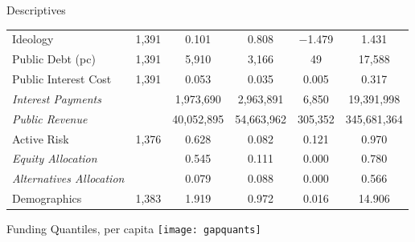 \documentclass{beamer}
\begin{document}
\begin{frame}{\textmd{Descriptives}}
\begin{table}
\begin{tiny}
\begin{center}
\begin{tabular}{@{\extracolsep{5pt}}lccccc}
Ideology & 1,391 & 0.101 & 0.808 & $-$1.479 & 1.431 \\ 
Public Debt (pc) & 1,391 & 5,910 & 3,166 & 49 & 17,588 \\ 
Public Interest Cost & 1,391 & 0.053 & 0.035 & 0.005 & 0.317 \\ 
\hspace*{0.25cm} \emph{Interest Payments} &  & 1,973,690 & 2,963,891 & 6,850 & 19,391,998 \\ 
\hspace*{0.25cm} \emph{Public Revenue} &  & 40,052,895 & 54,663,962 & 305,352 & 345,681,364 \\ 
Active Risk & 1,376 & 0.628 & 0.082 & 0.121 & 0.970 \\ 
\hspace*{0.25cm} \emph{Equity Allocation} & & 0.545 & 0.111 & 0.000 & 0.780 \\ 
\hspace*{0.25cm} \emph{Alternatives Allocation} & & 0.079 & 0.088 & 0.000 & 0.566 \\ 
Demographics & 1,383 & 1.919 & 0.972 & 0.016 & 14.906 \\ 
\hline 
\end{tabular} 
\end{center}
\end{tiny}
\end{table} 

\end{frame}

\begin{frame}{\textmd{Funding Quantiles, per capita}}
    \texttt{[image: gapquants]}
\end{frame}
\end{document}
